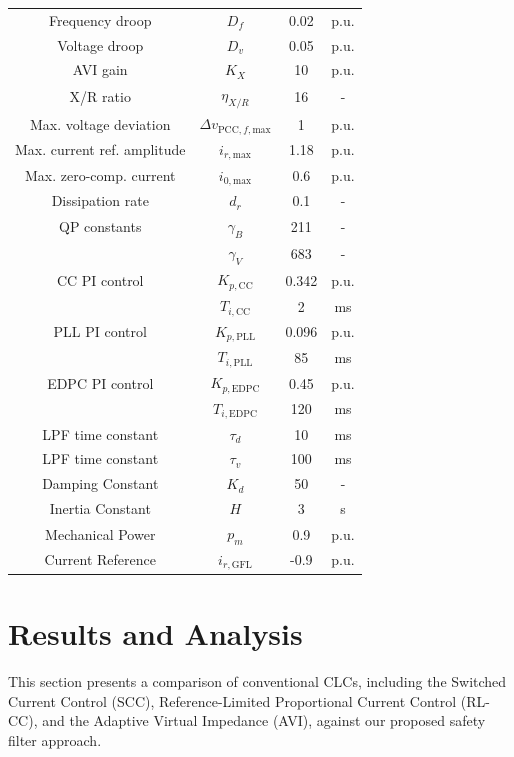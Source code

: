 \documentclass[lettersize,journal]{IEEEtran}
\newcommand{\markAsChanged}[1]{{\color{black}#1}}
\begin{document}
\begin{table}[!t]
\begin{tabular}{|c|c|c|c|}
      Frequency droop & $D_f$ & 0.02 & p.u. \\
      Voltage droop & $D_v$ & 0.05 & p.u. \\
      AVI gain & $K_X$ & 10 & p.u. \\
      X/R ratio & $\eta_{X/R}$ & 16 & - \\
      Max. voltage deviation & $\Delta v_{\text{PCC},f,\text{max}}$ & 1 & p.u. \\
      Max. current ref. amplitude & $i_{r,\text{max}}$ & 1.18 & p.u. \\
      Max. zero-comp. current & $i_{0,\text{max}}$ & 0.6 & p.u. \\
      Dissipation rate & $d_r$ & 0.1 & - \\
      QP constants & $\gamma_B$ & 211 & - \\
      & $\gamma_V$ & 683 & - \\
      CC PI control & $K_{p,\text{CC}}$ & 0.342 & p.u. \\
      & $T_{i, \text{CC}}$ & 2 & ms \\
      PLL PI control & $K_{p,\text{PLL}}$ & 0.096 & p.u. \\
      & $T_{i, \text{PLL}}$ & 85 & ms \\
      EDPC PI control & $K_{p,\text{EDPC}}$ & 0.45 & p.u. \\
       & $T_{i, \text{EDPC}}$ & 120 & ms \\
      LPF time constant & $\tau_d$ & 10 & ms \\
      LPF time constant & $\tau_v$ & 100 & ms \\
      Damping Constant & $K_d$ & 50 & - \\
      Inertia Constant & $H$ & 3 & s \\
      Mechanical Power & $p_m$ & 0.9 & p.u. \\
      Current Reference & $i_{r, \text{GFL}}$ & -0.9 & p.u. \\
      \hline
   \end{tabular}
\end{table}






\section{Results and Analysis}  \label{sec:test_results}

\markAsChanged{This section presents a comparison of conventional CLCs, including the Switched Current Control (SCC), Reference-Limited Proportional Current Control (RL-CC), and the Adaptive Virtual Impedance (AVI), against our proposed safety filter approach.}
\end{document}

